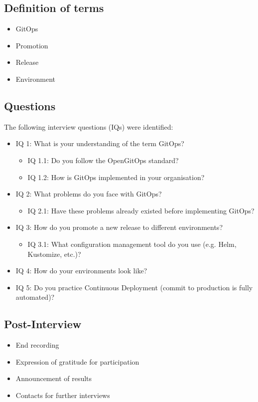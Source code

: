 \subsection{Definition of terms}

\begin{itemize}
	\item GitOps
	\item Promotion
	\item Release
	\item Environment
\end{itemize}

\subsection{Questions}

The following interview questions (IQs) were identified:

\begin{itemize}
	\item IQ 1: What is your understanding of the term GitOps?
	\begin{itemize}
		\item IQ 1.1: Do you follow the OpenGitOps standard?
		\item IQ 1.2: How is GitOps implemented in your organisation?
	\end{itemize}

	\item IQ 2: What problems do you face with GitOps?
	\begin{itemize}
		\item IQ 2.1: Have these problems already existed before implementing GitOps?
	\end{itemize}

	\item IQ 3: How do you promote a new release to different environments?
	\begin{itemize}
		\item IQ 3.1: What configuration management tool do you use (e.g. Helm, Kustomize, etc.)?
	\end{itemize}

	\item IQ 4: How do your environments look like?
	
	\item IQ 5: Do you practice Continuous Deployment (commit to production is fully automated)?

\end{itemize}

\subsection{Post-Interview}

\begin{itemize}
	\item End recording
	\item Expression of gratitude for participation
	\item Announcement of results
	\item Contacts for further interviews
\end{itemize}
